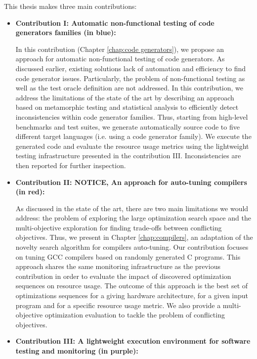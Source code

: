This thesis makes three main contributions:
\begin{itemize}
	\item \textbf{Contribution I: Automatic non-functional testing of code generators families (in blue): }
	
	In this contribution (Chapter \ref{chap:code generators}), we propose an approach for automatic non-functional  testing of code generators. As discussed earlier, existing solutions lack of automation and efficiency to find code generator issues. Particularly, the problem of non-functional testing as well as the test oracle definition are not addressed. In this contribution, we address the limitations of the state of the art by describing an approach based on metamorphic testing and statistical analysis to efficiently detect inconsistencies within code generator families.
	Thus, starting from high-level benchmarks and test suites, we generate automatically source code to five different target languages (i.e. using a code generator family). We execute the generated code and evaluate the resource usage metrics using the lightweight testing infrastructure presented in the contribution III. Inconsistencies are then reported for further inspection.  
	
	\item \textbf{Contribution II: NOTICE, An approach for auto-tuning compilers (in red):}
	
	As discussed in the state of the art, there are two main limitations we would address: the problem of exploring the large optimization search space and the multi-objective exploration for finding trade-offs between conflicting objectives. 
	Thus, we present in Chapter \ref{chap:compilers}, an adaptation of the novelty search algorithm for compilers auto-tuning. Our contribution focuses on tuning GCC compilers based on randomly generated C programs.
	This approach shares the same monitoring infrastructure as the previous contribution in order to evaluate the impact of discovered optimization sequences on resource usage. The outcome of this approach is the best set of optimizations sequences for a giving hardware architecture, for a given input program and for a specific resource usage metric. We also provide a multi-objective optimization evaluation to tackle the problem of conflicting objectives.
	
	\item \textbf{Contribution III: A lightweight execution environment for software testing and monitoring (in purple):}
	

\end{itemize}
